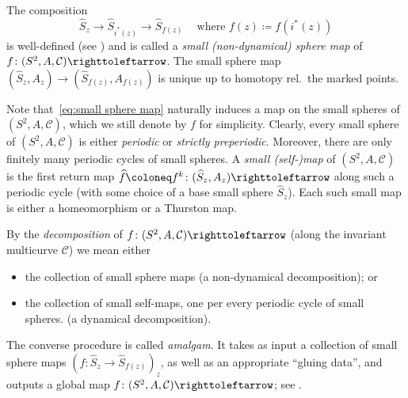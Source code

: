 \documentclass{amsart}
\theoremstyle{plain}
\theoremstyle{definition}
\theoremstyle{remark}
\newcommand{\reminder}[1]{\textsl{$\lhd\rhd$#1$\lhd\rhd$}\marginpar{$\lhd\rhd\lhd\rhd\lhd\rhd$}}%
\newcommand{\hide}[1]{}
\renewcommand{\sp}{{\ \ }}
\newcommand{\CC}{{\mathcal C}}
\newcommand\selfmap{\righttoleftarrow}
\begin{document}
The composition 
\begin{equation}
\label{eq:small sphere map}
\widehat S_z\to \widehat S_{i^*(z)} \to \widehat S_{f(z)} \sp\sp\text{ where } f(z)\coloneq f (i^* (z)) 
\end{equation}
is well-defined (see \cite[Lemma 4.9]{BD_Dec}) and is called a \emph{small (non-dynamical) sphere map} of $f\colon(S^2,A,\CC)\selfmap$. The small sphere map $(\widehat S_z, A_z)\to  (\widehat S_{f(z)}, A_{f(z)})$ is unique up to homotopy rel.\ the marked points. 


Note that~\eqref{eq:small sphere map} naturally induces a map on the small spheres of $(S^2,A,\CC)$, which we still denote by $f$ for simplicity. Clearly, every small sphere of $(S^2,A,\CC)$ is either \emph{periodic} or \emph{strictly preperiodic}. Moreover, there are only finitely many periodic cycles of small spheres. A \emph{small (self-)map} of $(S^2,A,\CC)$ is the first return map $\widehat f\coloneq f^k \colon (\widehat S_z, A_z) \selfmap$ along such a periodic cycle (with some choice of a base small sphere $\widehat S_z$). Each such small map is either a homeomorphism or a Thurston map. 


By the \emph{decomposition} of $f\colon(S^2,A,\CC)\selfmap$ (along the invariant multicurve $\CC$) we mean 
either
\begin{itemize}
\item  the collection of small sphere maps (a non-dynamical decomposition); or
\item  
the collection of small self-maps, one per every periodic cycle of small spheres.
(a dynamical decomposition).
\end{itemize}

The converse procedure is called \emph{amalgam}. It takes as input a collection of small sphere maps $(f\colon \widehat S_z\to \widehat S_{f(z)})_z$, as well as an appropriate ``gluing data'',  and outputs a global map $f\colon(S^2,A,\CC)\selfmap$; see \cite[\S3]{Pilgrim_Comb}.


\end{document}
